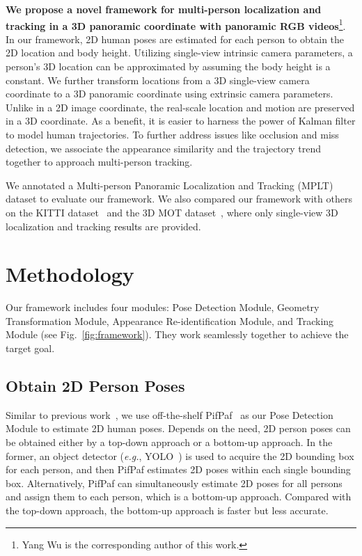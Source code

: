 \documentclass{article}
\newcommand{\eg}{{\it e.g.}}
\newcommand{\YangProof}[1]{\textcolor{black}{#1}}
\begin{document}
\textbf{We propose a novel framework for multi-person localization and tracking in a 3D panoramic coordinate with panoramic RGB videos}\footnote{Yang Wu is the corresponding author of this work.}. In our framework, 2D human poses are estimated for each person to obtain the 2D location and body height. Utilizing single-view intrinsic camera parameters, a person's 3D location can be approximated by assuming the body height is a constant. We further transform locations from a 3D single-view camera coordinate to a 3D panoramic coordinate using extrinsic camera parameters. Unlike in a 2D image coordinate, the real-scale location and motion are preserved in a 3D coordinate. As a benefit, it is easier to harness the power of Kalman filter to model human trajectories. To further address issues like occlusion and miss detection, we associate the appearance similarity and the trajectory trend together to approach multi-person tracking.

We annotated a Multi-person Panoramic Localization and Tracking (MPLT) dataset to evaluate our framework. We also compared our framework with others on the KITTI dataset~\cite{Geiger2012CVPR} and the 3D MOT dataset~\cite{andriluka2010monocular}, where only single-view 3D localization and tracking \YangProof{results} are provided.


\section{Methodology}
\label{sec:method}

Our framework includes four modules: Pose Detection Module, Geometry Transformation Module, Appearance Re-identification Module, and Tracking Module (see Fig.~\ref{fig:framework}). They work seamlessly together to achieve the target goal. 


\subsection{Obtain 2D Person Poses}
Similar to previous work~\cite{bertoni2019monoloco}, we use off-the-shelf PifPaf~\cite{kreiss2019pifpaf} as our Pose Detection Module to estimate 2D human poses. Depends on the need, 2D person poses can be obtained either by a top-down approach or a bottom-up approach. In the former, an object detector (\eg, YOLO~\cite{redmon2016you}) is used to acquire the 2D bounding box for each person, and then PifPaf estimates 2D poses within each single bounding box. Alternatively, PifPaf can simultaneously estimate 2D poses for all persons and assign them to each person, which is a bottom-up approach. Compared with the top-down approach, the bottom-up approach is faster but less accurate.
\end{document}
